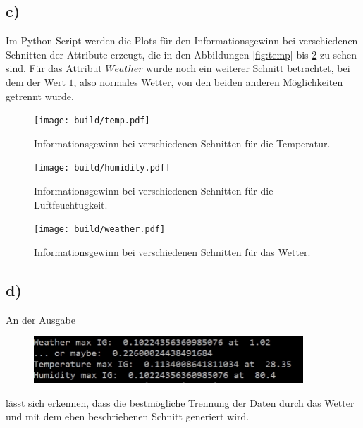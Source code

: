 \subsection*{c)}
Im Python-Script werden die Plots für den Informationsgewinn bei verschiedenen Schnitten der Attribute erzeugt, die in den Abbildungen \ref{fig:temp} bis \ref{fig:weather} zu sehen sind.
Für das Attribut $Weather$ wurde noch ein weiterer Schnitt betrachtet, bei dem der Wert $1$, also normales Wetter, von den beiden anderen Möglichkeiten getrennt wurde.
\begin{figure}
\texttt{[image: build/temp.pdf]}
\caption{Informationsgewinn bei verschiedenen Schnitten für die Temperatur.}\label{fig:temp}
\texttt{[image: build/humidity.pdf]}
\caption{Informationsgewinn bei verschiedenen Schnitten für die Luftfeuchtugkeit.}\label{fig:hum}
\end{figure}
\newpage
\begin{figure}
\texttt{[image: build/weather.pdf]}
\caption{Informationsgewinn bei verschiedenen Schnitten für das Wetter.}\label{fig:weather}
\end{figure}

\subsection*{d)}
\noindent An der Ausgabe
\begin{figure}
\centering
\includegraphics[width = 0.9\textwidth]{content/tables/out.pdf}
\end{figure}
\noindent lässt sich erkennen, dass die bestmögliche Trennung der Daten durch das Wetter und mit dem eben beschriebenen Schnitt generiert wird.

